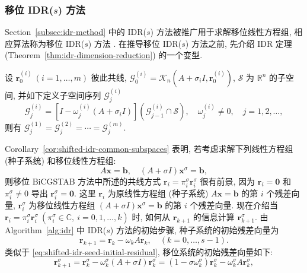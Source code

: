 \subsubsection{{移位 IDR($s$) 方法}}\label{subsec:shifted-idr}
{Section\ \ref{subsec:idr-method} 中的 IDR($s$) 方法被推广用于求解移位线性方程组, \newline{}相应算法称为移位 IDR($s$) 方法 . \newline{}在推导移位 IDR($s$) 方法之前, 先介绍 IDR 定理 (Theorem\ \ref{thm:idr-dimension-reduction}) 的一个变型.}
\par{}
\begin{Corollary}[\BookCite{48}]\label{cor:shifted-idr-common-subspaces}
{设 $\bm r_0^{(i)}\ (i=1,\ldots,m)$ 彼此共线, $\mathcal G_0^{(i)}=\mathcal K_n(A+\sigma_i I,\bm r_0^{(i)})$, $\mathcal S$ 为 $\mathbb R^n$ 的子空间, 并如下定义子空间序列 $\mathcal G_j^{(i)}$}
\[\mathcal G_j^{(i)}=[I-\omega_j^{(i)}(A+\sigma_i I)](\mathcal G_{j-1}^{(i)}\cap\mathcal S),\quad\omega_j^{(i)}\ne0,\quad j=1,2,\ldots,\]
{则有 $\mathcal G_j^{(1)}=\mathcal G_j^{(2)}=\cdots=\mathcal G_j^{(m)}$.}
\end{Corollary}
{Corollary\ \ref{cor:shifted-idr-common-subspaces} 表明, 若考虑求解下列线性方程组 (种子系统) 和移位线性方程组:}
\[A\bm x=\bm b,\quad(A+\sigma I)\bm x^{\sigma}=\bm b,\]
{则移位 BiCGSTAB 方法中所述的共线方式 $\bm r_i=\pi_i^{\sigma}\bm r_i^{\sigma}$ 很有前景, 因为 $\bm r_i=\bm0$ 和 $\pi_i^{\sigma}\ne0$ 导出 $\bm r_i^{\sigma}=\bm0$. 这里 $\bm r_i$ 为原线性方程组 (种子系统) $A\bm x=\bm b$ 的第 $i$ 个残差向量, $\bm r_i^{\sigma}$ 为移位线性方程组 $(A+\sigma I)\bm x^{\sigma}=\bm b$ 的第 $i$ 个残差向量. 现在介绍当 $\bm r_i=\pi_i^{\sigma}\bm r_i^{\sigma}\ (\pi_i^{\sigma}\in\mathbb C,\ i=0,1,\ldots,k)$ 时, 如何从 $\bm r_{k+1}$ 的信息计算 $\bm r_{k+1}^{\sigma}$.}
{由 Algorithm\ \ref{alg:idr} 中 IDR($s$) 方法的初始步骤, 种子系统的初始残差向量为}
\begin{equation}\label{eq:shifted-idr-seed-initial-residual}\bm r_{k+1}=\bm r_k-\omega_kA\bm r_k,\quad(k=0,\ldots,s-1).\end{equation}
{类似于 \eqref{eq:shifted-idr-seed-initial-residual}, 移位系统的初始残差向量如下:}
\begin{equation}\label{eq:shifted-idr-shifted-initial-residual}\bm r_{k+1}^{\sigma}=\bm r_k^{\sigma}-\omega_k^{\sigma}(A+\sigma I)\bm r_k^{\sigma}=(1-\sigma\omega_k^{\sigma})\bm r_k^{\sigma}-\omega_k^{\sigma}A\bm r_k^{\sigma},\end{equation}
